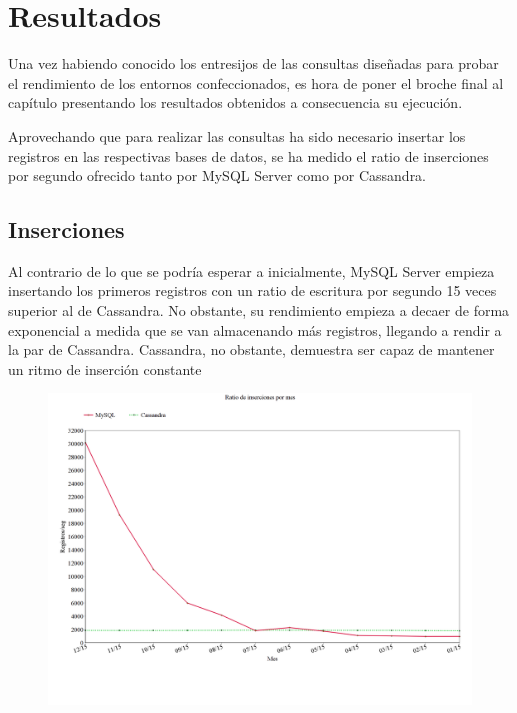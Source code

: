 \clearpage

\section{Resultados}

Una vez habiendo conocido los entresijos de las consultas diseñadas para probar el rendimiento de los entornos confeccionados, es hora de poner el broche final al capítulo presentando los resultados obtenidos a consecuencia su ejecución.

Aprovechando que para realizar las consultas ha sido necesario insertar los registros en las respectivas bases de datos, se ha medido el ratio de inserciones por segundo ofrecido tanto por MySQL Server como por Cassandra.\\ 

\subsection{Inserciones}

Al contrario de lo que se podría esperar a inicialmente\cite{rabl2012solving}, MySQL Server empieza insertando los primeros registros con un ratio de escritura por segundo 15 veces superior al de Cassandra. No obstante, su rendimiento empieza a decaer de forma exponencial a medida que se van almacenando más registros, llegando a rendir a la par de Cassandra. Cassandra, no obstante,  demuestra ser capaz de mantener un ritmo de inserción constante
 
 \begin{figure}[h]
 	\centering
 	\includegraphics[width=1\textwidth]{Ilustraciones/registrosPorSeg.png}
 \end{figure}
 
